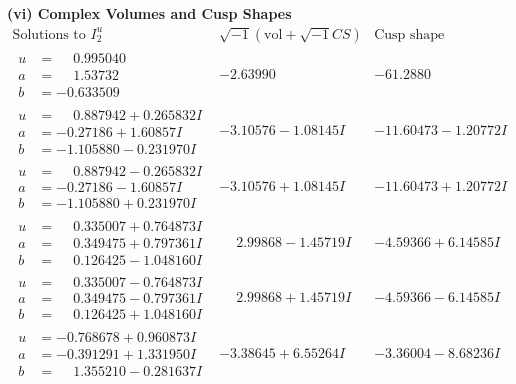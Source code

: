\documentclass[1p]{elsarticle_modified}
\theoremstyle{definition}
\newcommand{\I}{\sqrt{-1}}
\begin{document}
\newpage\flushleft \textbf{(vi) Complex Volumes and Cusp Shapes}
$$\begin{array}{c|c|c}  
\text{Solutions to }I^u_{2}& \I (\text{vol} + \sqrt{-1}CS) & \text{Cusp shape}\\
 \hline 
\begin{aligned}
u &= \phantom{-}0.995040\phantom{ +0.000000I} \\
a &= \phantom{-}1.53732\phantom{ +0.000000I} \\
b &= -0.633509\phantom{ +0.000000I}\end{aligned}
 & -2.63990\phantom{ +0.000000I} & -61.2880\phantom{ +0.000000I} \\ \hline\begin{aligned}
u &= \phantom{-}0.887942 + 0.265832 I \\
a &= -0.27186 + 1.60857 I \\
b &= -1.105880 - 0.231970 I\end{aligned}
 & -3.10576 - 1.08145 I & -11.60473 - 1.20772 I \\ \hline\begin{aligned}
u &= \phantom{-}0.887942 - 0.265832 I \\
a &= -0.27186 - 1.60857 I \\
b &= -1.105880 + 0.231970 I\end{aligned}
 & -3.10576 + 1.08145 I & -11.60473 + 1.20772 I \\ \hline\begin{aligned}
u &= \phantom{-}0.335007 + 0.764873 I \\
a &= \phantom{-}0.349475 + 0.797361 I \\
b &= \phantom{-}0.126425 - 1.048160 I\end{aligned}
 & \phantom{-}2.99868 - 1.45719 I & -4.59366 + 6.14585 I \\ \hline\begin{aligned}
u &= \phantom{-}0.335007 - 0.764873 I \\
a &= \phantom{-}0.349475 - 0.797361 I \\
b &= \phantom{-}0.126425 + 1.048160 I\end{aligned}
 & \phantom{-}2.99868 + 1.45719 I & -4.59366 - 6.14585 I \\ \hline\begin{aligned}
u &= -0.768678 + 0.960873 I \\
a &= -0.391291 + 1.331950 I \\
b &= \phantom{-}1.355210 - 0.281637 I\end{aligned}
 & -3.38645 + 6.55264 I & -3.36004 - 8.68236 I \\ \hline\begin{aligned}

\end{aligned}
\end{array}$$
\end{document}

